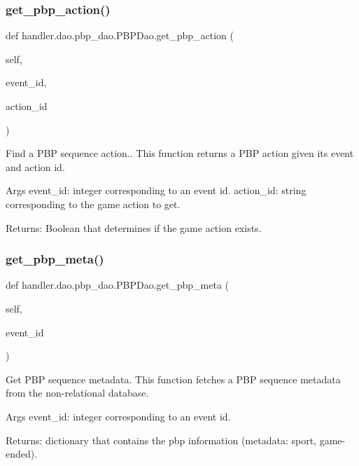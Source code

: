 \subsubsection{\texorpdfstring{get\+\_\+pbp\+\_\+action()}{get\_pbp\_action()}}
{\footnotesize\ttfamily def handler.\+dao.\+pbp\+\_\+dao.\+P\+B\+P\+Dao.\+get\+\_\+pbp\+\_\+action (\begin{DoxyParamCaption}\item[{}]{self,  }\item[{}]{event\+\_\+id,  }\item[{}]{action\+\_\+id }\end{DoxyParamCaption})}

\begin{DoxyVerb}Find a PBP sequence action..
This function returns a PBP action given its event and action id.

Args
    event_id: integer corresponding to an event id.
    action_id: string corresponding to the game action to get.

Returns:
    Boolean that determines if the game action exists.
\end{DoxyVerb}
 \mbox{\label{classhandler_1_1dao_1_1pbp__dao_1_1_p_b_p_dao_ab1bdedda8cf62dc923c4edc53ac96e62}} 
\subsubsection{\texorpdfstring{get\+\_\+pbp\+\_\+meta()}{get\_pbp\_meta()}}
{\footnotesize\ttfamily def handler.\+dao.\+pbp\+\_\+dao.\+P\+B\+P\+Dao.\+get\+\_\+pbp\+\_\+meta (\begin{DoxyParamCaption}\item[{}]{self,  }\item[{}]{event\+\_\+id }\end{DoxyParamCaption})}

\begin{DoxyVerb}Get PBP sequence metadata.
This function fetches a PBP sequence metadata from the non-relational database.

Args
    event_id: integer corresponding to an event id.

Returns:
    dictionary that contains the pbp information (metadata: sport, game-ended).
\end{DoxyVerb}
 \mbox{\label{classhandler_1_1dao_1_1pbp__dao_1_1_p_b_p_dao_aaad531a52c756adac0a37ff83ee512e0}} 
